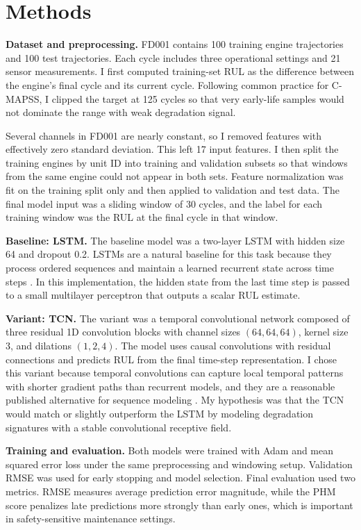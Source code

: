 \documentclass{article}
\begin{document}
\section{Methods}

\textbf{Dataset and preprocessing.} FD001 contains 100 training engine trajectories and 100 test trajectories. Each cycle includes three operational settings and 21 sensor measurements. I first computed training-set RUL as the difference between the engine's final cycle and its current cycle. Following common practice for C-MAPSS, I clipped the target at 125 cycles so that very early-life samples would not dominate the range with weak degradation signal.

Several channels in FD001 are nearly constant, so I removed features with effectively zero standard deviation. This left 17 input features. I then split the training engines by unit ID into training and validation subsets so that windows from the same engine could not appear in both sets. Feature normalization was fit on the training split only and then applied to validation and test data. The final model input was a sliding window of 30 cycles, and the label for each training window was the RUL at the final cycle in that window.

\textbf{Baseline: LSTM.} The baseline model was a two-layer LSTM with hidden size 64 and dropout 0.2. LSTMs are a natural baseline for this task because they process ordered sequences and maintain a learned recurrent state across time steps \citep{hochreiter1997lstm}. In this implementation, the hidden state from the last time step is passed to a small multilayer perceptron that outputs a scalar RUL estimate.

\textbf{Variant: TCN.} The variant was a temporal convolutional network composed of three residual 1D convolution blocks with channel sizes $(64,64,64)$, kernel size 3, and dilations $(1,2,4)$. The model uses causal convolutions with residual connections and predicts RUL from the final time-step representation. I chose this variant because temporal convolutions can capture local temporal patterns with shorter gradient paths than recurrent models, and they are a reasonable published alternative for sequence modeling \citep{lea2017tcn}. My hypothesis was that the TCN would match or slightly outperform the LSTM by modeling degradation signatures with a stable convolutional receptive field.

\textbf{Training and evaluation.} Both models were trained with Adam and mean squared error loss under the same preprocessing and windowing setup. Validation RMSE was used for early stopping and model selection. Final evaluation used two metrics. RMSE measures average prediction error magnitude, while the PHM score penalizes late predictions more strongly than early ones, which is important in safety-sensitive maintenance settings.
\end{document}
